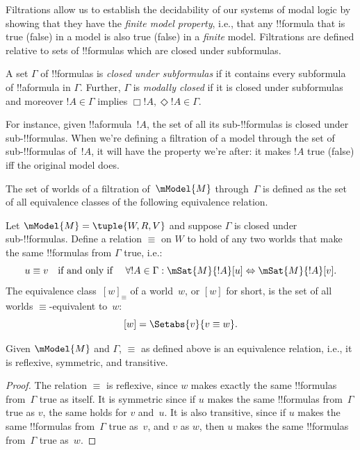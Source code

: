 \documentclass[../../../include/open-logic-section]{subfiles}
\begin{document}


Filtrations allow us to establish the decidability of our systems of
modal logic by showing that they have the \emph{finite model
  property}, i.e., that any !!{formula} that is true (false) in a
model is also true (false) in a \emph{finite} model.  Filtrations are
defined relative to sets of !!{formula}s which are closed under
subformulas.

\begin{defn}
  A set $\Gamma$ of !!{formula}s is \emph{closed under subformulas} if it
  contains every subformula of !!a{formula} in $\Gamma$. Further,
  $\Gamma$ is \emph{modally closed} if it is closed under subformulas
  and moreover $!A \in \Gamma$ implies $\Box!A,
  \Diamond!A \in \Gamma$. 
\end{defn}

For instance, given !!a{formula}~$!A$, the set of all its
sub-!!{formula}s is closed under sub-!!{formula}s. When we're defining
a filtration of a model through the set of sub-!!{formula}s of~$!A$,
it will have the property we're after: it makes $!A$ true (false) iff
the original model does.

The set of worlds of a filtration of~$\mModel{M}$ through~$\Gamma$ is
defined as the set of all equivalence classes of the following
equivalence relation.

\begin{defn}
Let $\mModel{M} =\tuple{W, R, V}$ and suppose $\Gamma$ is closed under
sub-!!{formula}s. Define a relation $\equiv$ on $W$ to hold of any two
worlds that make the same !!{formula}s from $\Gamma$ true, i.e.:
\[
u \equiv v \quad \text{if and only if } \quad 
\forall !A \in \Gamma : \mSat{M}{!A}[u] \Leftrightarrow \mSat{M}{!A}[v].
\]
The equivalence class~$[w]_\equiv$ of a world~$w$, or $[w]$ for short,
is the set of all worlds $\equiv$-equivalent to~$w$:
\[
[w] = \Setabs{v}{v \equiv w}.
\]
\end{defn}

\begin{prop}
  Given $\mModel{M}$ and $\Gamma$, $\equiv$ as defined above is an
  equivalence relation, i.e., it is reflexive, symmetric, and
  transitive.
\end{prop}

\begin{proof}
  The relation $\equiv$ is reflexive, since $w$ makes exactly the same
  !!{formula}s from~$\Gamma$ true as itself. It is symmetric since if
  $u$ makes the same !!{formula}s from~$\Gamma$ true as $v$, the same
  holds for $v$ and~$u$. It is also transitive, since if $u$ makes the
  same !!{formula}s from~$\Gamma$ true as~$v$, and $v$ as $w$, then
  $u$ makes the same !!{formula}s from~$\Gamma$ true as~$w$.
\end{proof}
\end{document}
